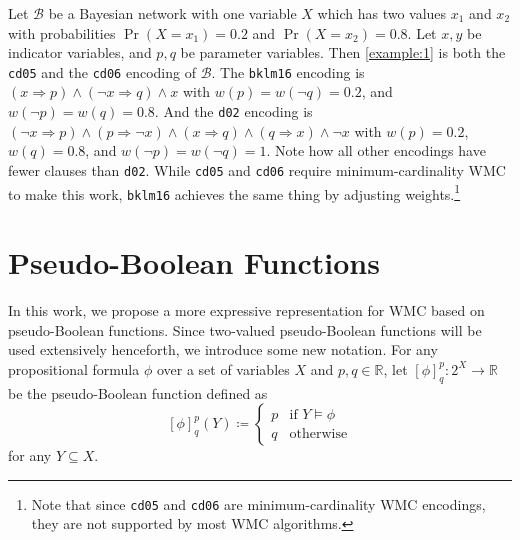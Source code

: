 \begin{example}\label{example:2}
  Let $\mathcal{B}$ be a Bayesian network with one variable $X$ which has two
  values $x_1$ and $x_2$ with probabilities $\Pr(X = x_1) = 0.2$ and $\Pr(X =
  x_2) = 0.8$. Let $x, y$ be indicator variables, and $p, q$ be parameter
  variables. Then \cref{example:1} is both the \texttt{cd05} and the
  \texttt{cd06} encoding of $\mathcal{B}$. The \texttt{bklm16} encoding is $(x
  \Rightarrow p) \land (\neg x \Rightarrow q) \land x$ with $w(p) = w(\neg q) =
  0.2$, and $w(\neg p) = w(q) = 0.8$. And the \texttt{d02} encoding is $(\neg x
  \Rightarrow p) \land (p \Rightarrow \neg x) \land (x \Rightarrow q) \land (q
  \Rightarrow x) \land \neg x$ with $w(p) = 0.2$, $w(q) = 0.8$, and $w(\neg p) =
  w(\neg q) = 1$. Note how all other encodings have fewer clauses than
  \texttt{d02}. While \texttt{cd05} and \texttt{cd06} require
  minimum-cardinality WMC to make this work, \texttt{bklm16} achieves the same
  thing by adjusting weights.\footnote{Note that since \texttt{cd05} and
    \texttt{cd06} are minimum-cardinality WMC encodings, they are not supported
    by most WMC algorithms.}
\end{example}


\section{Pseudo-Boolean Functions}

In this work, we propose a more expressive representation for WMC based on
pseudo-Boolean functions. Since two-valued pseudo-Boolean functions will be used
extensively henceforth, we introduce some new notation. For any propositional
formula $\phi$ over a set of variables $X$ and $p, q \in \mathbb{R}$, let
${[\phi]}^p_q\colon 2^X \to \mathbb{R}$ be the pseudo-Boolean function defined
as
\[
  {[\phi]}^p_q(Y) \coloneqq
  \begin{cases}
    p & \text{if } Y \models \phi \\
    q & \text{otherwise}
  \end{cases}
\]
for any $Y \subseteq X$.


